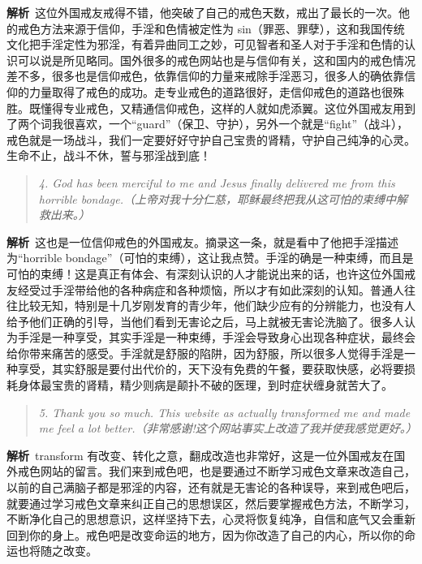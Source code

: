 \textbf{解析}\ 这位外国戒友戒得不错，他突破了自己的戒色天数，戒出了最长的一次。他的戒色方法来源于信仰，手淫和色情被定性为 sin（罪恶、罪孽），这和我国传统文化把手淫定性为邪淫，有着异曲同工之妙，可见智者和圣人对于手淫和色情的认识可以说是所见略同。国外很多的戒色网站也是与信仰有关，这和国内的戒色情况差不多，很多也是信仰戒色，依靠信仰的力量来戒除手淫恶习，很多人的确依靠信仰的力量取得了戒色的成功。走专业戒色的道路很好，走信仰戒色的道路也很殊胜。既懂得专业戒色，又精通信仰戒色，这样的人就如虎添翼。这位外国戒友用到了两个词我很喜欢，一个“guard”（保卫、守护），另外一个就是“fight”（战斗），戒色就是一场战斗，我们一定要好好守护自己宝贵的肾精，守护自己纯净的心灵。生命不止，战斗不休，誓与邪淫战到底！

\begin{quote}\it
    4. God has been merciful to me and Jesus finally delivered me from this horrible bondage.（上帝对我十分仁慈，耶稣最终把我从这可怕的束缚中解救出来。）
\end{quote}

\textbf{解析}\ 这也是一位信仰戒色的外国戒友。摘录这一条，就是看中了他把手淫描述为“horrible bondage”（可怕的束缚），这让我点赞。手淫的确是一种束缚，而且是可怕的束缚！这是真正有体会、有深刻认识的人才能说出来的话，也许这位外国戒友经受过手淫带给他的各种病症和各种烦恼，所以才有如此深刻的认知。普通人往往比较无知，特别是十几岁刚发育的青少年，他们缺少应有的分辨能力，也没有人给予他们正确的引导，当他们看到无害论之后，马上就被无害论洗脑了。很多人认为手淫是一种享受，其实手淫是一种束缚，手淫会导致身心出现各种症状，最终会给你带来痛苦的感受。手淫就是舒服的陷阱，因为舒服，所以很多人觉得手淫是一种享受，其实舒服是要付出代价的，天下没有免费的午餐，要获取快感，必将要损耗身体最宝贵的肾精，精少则病是颠扑不破的医理，到时症状缠身就苦大了。

\begin{quote}\it
    5. Thank you so much. This website as actually transformed me and made me feel a lot better.（非常感谢!这个网站事实上改造了我并使我感觉更好。）
\end{quote}

\textbf{解析}\ transform 有改变、转化之意，翻成改造也非常好，这是一位外国戒友在国外戒色网站的留言。我们来到戒色吧，也是要通过不断学习戒色文章来改造自己，以前的自己满脑子都是邪淫的内容，还有就是无害论的各种误导，来到戒色吧后，就要通过学习戒色文章来纠正自己的思想误区，然后要掌握戒色方法，不断学习，不断净化自己的思想意识，这样坚持下去，心灵将恢复纯净，自信和底气又会重新回到你的身上。戒色吧是改变命运的地方，因为你改造了自己的内心，所以你的命运也将随之改变。

